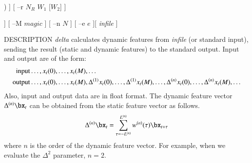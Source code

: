 \begin{synopsis}
	\item [delta] [ --m $M$ ] [ --l $L$ ] [ --t $T$ ] 
		[ --d ($fn$ $|$ $d_0$ [$d_1$ $\dots$]) ]
		[ --r $N_R$ $W_1$ [$W_2$] ]
 \item [\ ~~~~~~~]
 [ --R $N_R$ ${W_F}_{1}$ ${W_B}_{1}$ [${W_F}_{2}$ ${W_B}_{2}$]]
 [ --M $magic$ ] [ --n $N$ ] [ --e $e$ ][ {\em infile} ]
\end{synopsis}

\begin{qsection}{DESCRIPTION}
	{\em delta} calculates dynamic features from {\em infile} (or standard
	input), sending the result (static and dynamic features) to
        the standard output. Input and output are of the form:
    \begin{align}
	\mathrm{input}  & \dots, x_t(0), \dots, x_t(M), \dots \notag \\
	\mathrm{output} & \dots, x_t(0), \dots, x_t(M), \Delta^{(1)} x_t(0), \dots, \Delta^{(1)} x_t(M), \dots,
	\Delta^{(n)} x_t(0), \dots, \Delta^{(n)} x_t(M), \dots \notag
 \end{align}
Also, input and output data are in float format.
The dynamic feature vector $\Delta^{(n)}\bx_t$ can be
obtained from the static feature vector as follows.
 \begin{displaymath}
	\Delta^{(n)}\bx_t 
	= \sum_{\tau=-L^{(n)}}^{L^{(n)}} w^{(n)}(\tau)\bx_{t+\tau}
 \end{displaymath}
where $n$ is the order of the dynamic feature vector. For
example, when we evaluate the $\Delta^2$ parameter, $n=2$.
\end{qsection}

